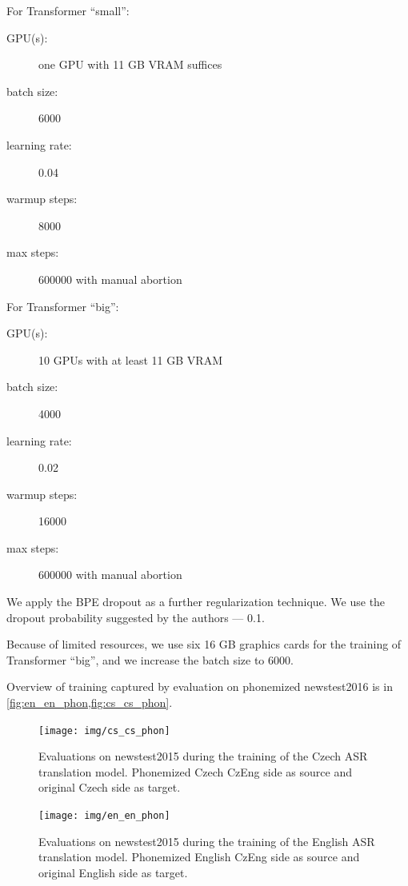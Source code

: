 For Transformer ``small'':
\begin{description}
	\item[GPU(s):] one GPU with 11 GB VRAM suffices
	\item[batch size:] 6000
	\item[learning rate:] 0.04
	\item[warmup steps:] 8000
	\item[max steps:] 600000 with manual abortion
\end{description}

For Transformer ``big'':
\begin{description}
	\item[GPU(s):] 10 GPUs with at least 11 GB VRAM
	\item[batch size:] 4000
	\item[learning rate:] 0.02
	\item[warmup steps:] 16000
	\item[max steps:] 600000 with manual abortion
\end{description}

We apply the BPE dropout  as a further regularization technique. We use the dropout probability suggested by the authors --- 0.1.

Because of limited resources, we use six 16 GB graphics cards for the training of Transformer ``big'', and we increase the batch size to 6000.

Overview of training captured by evaluation on phonemized newstest2016 is in \cref{fig:en_en_phon,fig:cs_cs_phon}.

\begin{figure}[h]
	\texttt{[image: img/cs\_cs\_phon]}
	\caption{Evaluations on newstest2015 during the training of the Czech ASR translation model. Phonemized Czech CzEng side as source and original Czech side as target.}
	\label{fig:cs_cs_phon}
\end{figure}



\begin{figure}[h]
	\texttt{[image: img/en\_en\_phon]}
	\caption{Evaluations on newstest2015 during the training of the English ASR translation model. Phonemized English CzEng side as source and original English side as target.}
	\label{fig:en_en_phon}
\end{figure}




